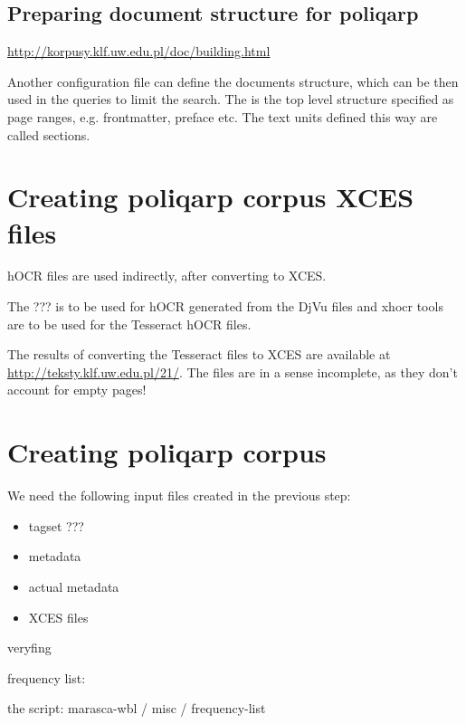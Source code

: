 \documentclass[runningheads,a4paper]{llncs}
\begin{document}
\subsection{Preparing document structure for poliqarp}
\label{sec:prep-docum-struct}

\url{http://korpusy.klf.uw.edu.pl/doc/building.html}


Another configuration file can define the documents structure, which
can be then used in the queries to limit the search. The is the top
level structure specified as page ranges, e.g. frontmatter, preface
etc.  The text units defined this way are called sections.




\section{Creating poliqarp corpus XCES files}
\label{sec:creat-poliq-corp-2}



hOCR files are used indirectly, after converting to XCES.

The ??? is to be used for hOCR generated from the DjVu files and xhocr
tools are to be used for the Tesseract hOCR files. 

The results of converting the Tesseract files to XCES are available at
\url{http://teksty.klf.uw.edu.pl/21/}. The files are in a sense
incomplete, as they don't account for empty pages!

\section{Creating poliqarp corpus}
\label{sec:creat-poliq-corp-3}

We need the following input files created in the previous step:

\begin{itemize}
\item tagset ???
\item metadata
\item actual metadata
\item XCES files
\end{itemize}


veryfing

frequency list:

the script:  marasca-wbl / misc / frequency-list
\end{document}
